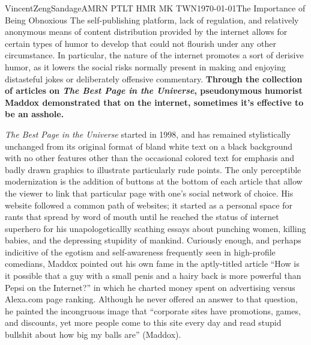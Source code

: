 \documentclass[12 pt]{article}
\begin{document}
\begin{mla}{Vincent}{Zeng}{Sandage}{AMRN PTLT HMR MK TWN}{\today}{The Importance of Being Obnoxious}
The self-publishing platform, lack of regulation, and relatively anonymous means of content distribution provided by the internet allows for certain types of humor to develop that could not flourish under any other circumstance. In particular, the nature of the internet promotes a sort of derisive humor, as it lowers the social risks normally present in making and enjoying distasteful jokes or deliberately offensive commentary. \textbf{Through the collection of articles on \textit{The Best Page in the Universe}, pseudonymous humorist Maddox demonstrated that on the internet, sometimes it's effective to be an asshole.}

	\textit{The Best Page in the Universe} started in 1998, and has remained stylistically unchanged from its original format of bland white text on a black background with no other features other than the occasional colored text for emphasis and badly drawn graphics to illustrate particularly rude points. The only perceptible modernization is the addition of buttons at the bottom of each article that allow the viewer to link that particular page with one's social network of choice. His website followed a common path of websites; it started as a personal space for rants that spread by word of mouth until he reached the status of internet superhero for his unapologeticallly scathing essays about punching women, killing babies, and the depressing stupidity of mankind. Curiously enough, and perhaps indicitive of the egotism and self-awareness frequently seen in high-profile comedians, Maddox pointed out his own fame in the aptly-titled article ``How is it possible that a guy with a small penis and a hairy back is more powerful than Pepsi on the Internet?'' in which he charted money spent on advertising versus Alexa.com page ranking. Although he never offered an answer to that question, he painted the incongruous image that ``corporate sites have promotions, games, and discounts, yet more people come to this site every day and read stupid bullshit about how big my balls are'' (Maddox).


\end{mla}
\end{document}
